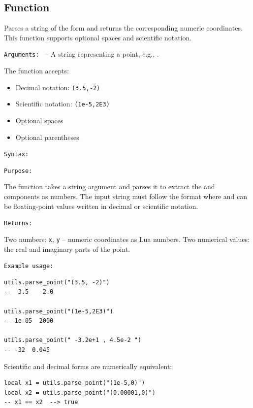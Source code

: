 \subsection{Function }
\label{sub:function_utils_parse_point}

Parses a string of the form  and returns the corresponding numeric coordinates. This function supports optional spaces and scientific notation.

\medskip
\texttt{Arguments: }  – A string representing a point, e.g., .

The function accepts:
\begin{itemize}
\item Decimal notation: \texttt{(3.5,-2)}
\item Scientific notation: \texttt{(1e-5,2E3)}
\item Optional spaces
\item Optional parentheses
\end{itemize}

\medskip
\texttt{Syntax: }

\begin{center}
\end{center}

\medskip
\texttt{Purpose: }

The function takes a string argument and parses it to extract the  and  components as numbers. The input string must follow the format  where  and  can be floating-point values written in decimal or scientific notation.


\medskip
\texttt{Returns: }

Two numbers: \texttt{x}, \texttt{y} – numeric coordinates as Lua numbers.
Two numerical values: the real and imaginary parts of the point.


\medskip
\texttt{Example usage: }

\begin{verbatim}
utils.parse_point("(3.5, -2)")
--  3.5   -2.0

utils.parse_point("(1e-5,2E3)")
-- 1e-05  2000

utils.parse_point(" -3.2e+1 , 4.5e-2 ")
-- -32  0.045
\end{verbatim}

Scientific and decimal forms are numerically equivalent:

\begin{verbatim}
local x1 = utils.parse_point("(1e-5,0)")
local x2 = utils.parse_point("(0.00001,0)")
-- x1 == x2  --> true
\end{verbatim}

